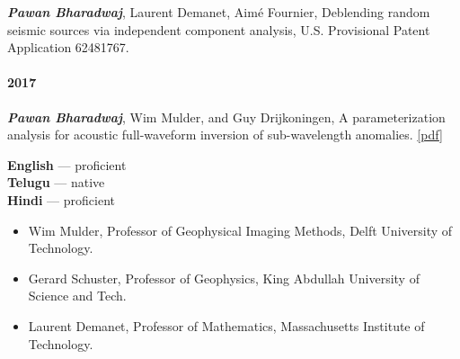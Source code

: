 \documentclass[9pt]{developercv} %
\begin{document}
\textbf{\emph{Pawan
Bharadwaj}},
Laurent
Demanet,
Aimé
Fournier,
Deblending
random
seismic
sources
via
independent
component
analysis,
U.S.
Provisional
Patent
Application
62481767.

\label{arxiv.org}

\paragraph{2017}\label{section-45}

\textbf{\emph{Pawan
Bharadwaj}},
Wim
Mulder,
and Guy
Drijkoningen,
A
parameterization
analysis
for
acoustic
full-waveform
inversion
of
sub-wavelength
anomalies.
\href{https://github.com/pawbz/pawbz.github.io/blob/src/pdf/papers/Param_arXiv.pdf}{{[}pdf{]}}

\begin{minipage}[t]{0.2\textwidth}
	

	\vspace{\baselineskip} %
	
	\textbf{English} --- proficient\\
	\textbf{Telugu} --- native\\
	\textbf{Hindi} --- proficient
\end{minipage}
\hfill
\begin{minipage}[t]{0.8\textwidth}
	
	
	\begin{itemize}
			\setlength\itemsep{0.5pt}
		\item Wim Mulder,  Professor of Geophysical Imaging Methods, Delft University of Technology.
		\item Gerard Schuster,  Professor of Geophysics, King Abdullah University of Science and Tech.
		\item Laurent Demanet, Professor of Mathematics, Massachusetts Institute of Technology.
 
	\end{itemize}
\end{minipage}

\end{document}
